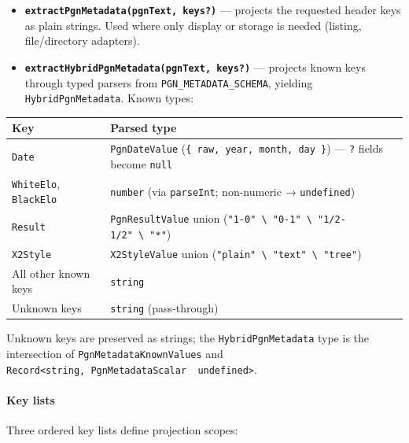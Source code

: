 \documentclass[]{article}
\providecommand{\tightlist}{%
  \setlength{\itemsep}{0pt}\setlength{\parskip}{0pt}}
\let\oldparagraph\paragraph
\renewcommand{\paragraph}[1]{\oldparagraph{#1}\mbox{}}
\begin{document}
\begin{itemize}
\tightlist
\item
  \textbf{\texttt{extractPgnMetadata(pgnText,\ keys?)}} --- projects the
  requested header keys as plain strings. Used where only display or
  storage is needed (listing, file/directory adapters).
\item
  \textbf{\texttt{extractHybridPgnMetadata(pgnText,\ keys?)}} ---
  projects known keys through typed parsers from
  \texttt{PGN\_METADATA\_SCHEMA}, yielding \texttt{HybridPgnMetadata}.
  Known types:
\end{itemize}

\begin{longtable}[]{@{}ll@{}}
\toprule
Key & Parsed type\tabularnewline
\midrule
\endhead
\texttt{Date} & \texttt{PgnDateValue}
(\texttt{\{\ raw,\ year,\ month,\ day\ \}}) --- \texttt{?} fields become
\texttt{null}\tabularnewline
\texttt{WhiteElo}, \texttt{BlackElo} & \texttt{number} (via
\texttt{parseInt}; non-numeric → \texttt{undefined})\tabularnewline
\texttt{Result} & \texttt{PgnResultValue} union
(\texttt{"1-0"\ \textbackslash{}\textbar{}\ "0-1"\ \textbackslash{}\textbar{}\ "1/2-1/2"\ \textbackslash{}\textbar{}\ "*"})\tabularnewline
\texttt{X2Style} & \texttt{X2StyleValue} union
(\texttt{"plain"\ \textbackslash{}\textbar{}\ "text"\ \textbackslash{}\textbar{}\ "tree"})\tabularnewline
All other known keys & \texttt{string}\tabularnewline
Unknown keys & \texttt{string} (pass-through)\tabularnewline
\bottomrule
\end{longtable}

Unknown keys are preserved as strings; the \texttt{HybridPgnMetadata}
type is the intersection of \texttt{PgnMetadataKnownValues} and
\texttt{Record\textless{}string,\ PgnMetadataScalar\ \textbar{}\ undefined\textgreater{}}.

\paragraph{Key lists}\label{key-lists}

Three ordered key lists define projection scopes:
\end{document}
